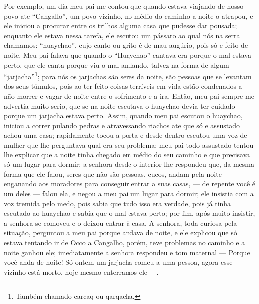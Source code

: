 Por exemplo, um dia meu pai me contou que quando estava viajando de nosso povo ate ``Cangallo'', um povo vizinho, no médio do caminho a noite o atrapou, e ele iniciou a procurar entre os trilhos alguma casa que pudesse dar pousada; enquanto ele estava nessa tarefa, ele escutou um pássaro ao qual nós na serra chamamos: ``huaychao'', cujo canto ou grito é de mau augúrio, pois só e feito de noite.
Meu pai falava que quando o ``Huaychao'' cantava era porque o mal estava perto, que ele canta porque viu o mal andando, talvez na forma de algum ``jarjacha''\footnote{Também chamado carcaq ou qarqacha.}; para nós os jarjachas são seres da noite, são pessoas que se levantam dos seus túmulos, pois ao ter feito coisas terríveis em vida estão condenados a não morrer e vagar de noite entre o sofrimento e a ira. 
Então, meu pai sempre me advertia muito serio, que se na noite escutava o huaychao devia ter cuidado porque um jarjacha estava perto. 
Assim, quando meu pai escutou o huaychao, iniciou a correr pulando pedras e atravessando riachos ate que só e assustado achou uma casa; rapidamente tocou a porta e desde dentro escutou uma voz de mulher que lhe perguntava qual era seu problema; meu pai todo assustado tentou lhe explicar que a noite tinha chegado em médio do seu caminho e que precisava só um lugar para dormir; a senhora desde o interior lhe respondeu que, da mesma forma que ele falou, seres que não são pessoas, cucos, andam pela noite enganando aos moradores para conseguir entrar a suas casas, --- de repente você é um deles --- falou ela, e negou a meu pai um lugar para dormir; ele insistia com a voz tremida pelo medo, pois  sabia que tudo isso era verdade, pois já tinha escutado ao huaychao e sabia que o mal estava perto; por fim, após muito insistir, a senhora se comoveu e o deixou entrar à casa. 
A senhora, toda curiosa pela situação, perguntou a meu pai porque andava de noite, e ele explicou que só estava tentando ir de Occo a Cangalho, porém, teve problemas no caminho e a noite ganhou ele; imediatamente a senhora respondeu e tom maternal --- Porque você anda de noite! Só ontem um jarjacha comeu a uma pessoa, agora esse vizinho está morto, hoje mesmo enterramos ele ---.


